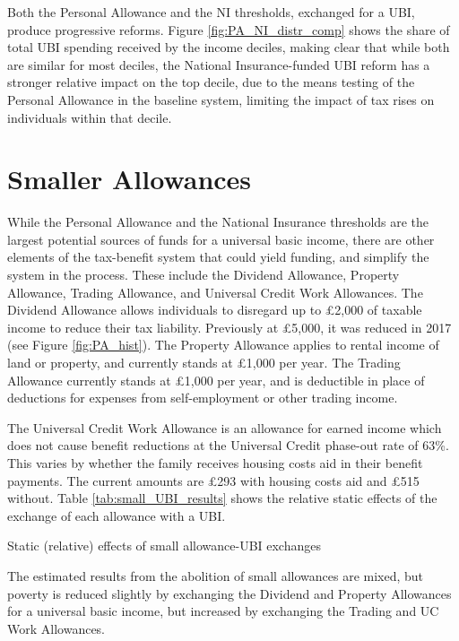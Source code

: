 \documentclass{article}
\begin{document}
    Both the Personal Allowance and the NI thresholds, exchanged for a UBI, produce progressive reforms. Figure \ref{fig:PA_NI_distr_comp} shows the share of total UBI spending received by the income deciles, making clear that while both are similar for most deciles, the National Insurance-funded UBI reform has a stronger relative impact on the top decile, due to the means testing of the Personal Allowance in the baseline system, limiting the impact of tax rises on individuals within that decile.

    \section{Smaller Allowances}

    While the Personal Allowance and the National Insurance thresholds are the largest potential sources of funds for a universal basic income, there are other elements of the tax-benefit system that could yield funding, and simplify the system in the process. These include the Dividend Allowance, Property Allowance, Trading Allowance, and Universal Credit Work Allowances. The Dividend Allowance allows individuals to disregard up to £2,000 of taxable income to reduce their tax liability. Previously at £5,000, it was reduced in 2017 (see Figure \ref{fig:PA_hist}). The Property Allowance applies to rental income of land or property, and currently stands at £1,000 per year. The Trading Allowance currently stands at £1,000 per year, and is deductible in place of deductions for expenses from self-employment or other trading income.

    The Universal Credit Work Allowance is an allowance for earned income which does not cause benefit reductions at the Universal Credit phase-out rate of 63\%. This varies by whether the family receives housing costs aid in their benefit payments. The current amounts are £293 with housing costs aid and £515 without. Table \ref{tab:small_UBI_results} shows the relative static effects of the exchange of each allowance with a UBI.

    \begin{table}[h]
        \centering
        
        \caption{Static (relative) effects of small allowance-UBI exchanges}
        \label{tab:small_UBI_results}
    \end{table}
    The estimated results from the abolition of small allowances are mixed, but poverty is reduced slightly by exchanging the Dividend and Property Allowances for a universal basic income, but increased by exchanging the Trading and UC Work Allowances.
\end{document}
